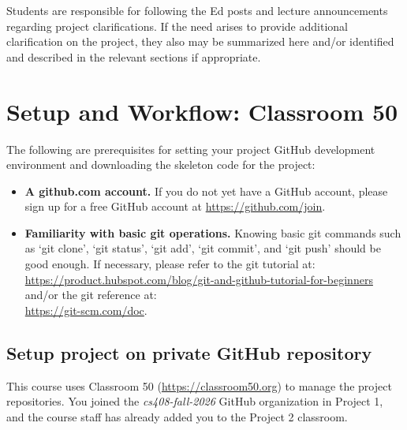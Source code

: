 \documentclass[letterpaper,11pt]{article}
\begin{document}
Students are responsible for following the Ed posts and lecture announcements
regarding project clarifications. If the need arises to provide additional
clarification on the project, they also may be summarized here and/or identified
and described in the relevant sections if appropriate.

\appendix
\section{Setup and Workflow: Classroom 50}
\label{sec:appx:setup}

The following are prerequisites for setting your project GitHub development
environment and downloading the skeleton code for the project:

\begin{itemize}

\item \textbf{A github.com account.}
					If you do not yet have a GitHub account,
					please sign up for a free GitHub account at \url{https://github.com/join}.

\item \textbf{Familiarity with basic git operations.}
					Knowing basic git commands such as `git clone', `git status', `git add',
					`git commit', and `git push' should be good enough. If necessary,
					please refer to the git tutorial at:\\
          \url{https://product.hubspot.com/blog/git-and-github-tutorial-for-beginners}\\
          and/or the git reference at:\\
          \url{https://git-scm.com/doc}.

\end{itemize}

\subsection{Setup project on private GitHub repository}
\label{sec:appx:classroom}

This course uses Classroom 50 (\url{https://classroom50.org}) to manage the
project repositories. You joined the \emph{cs408-fall-2026} GitHub
organization in Project 1, and the course staff has already added you to the
Project 2 classroom.
\end{document}
